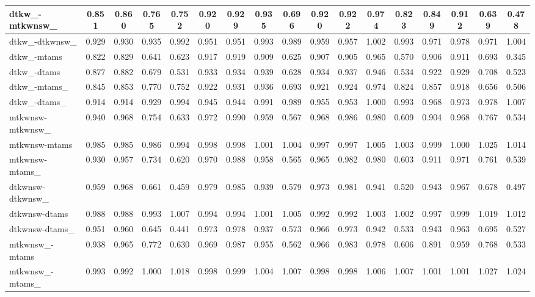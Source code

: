 \documentclass[%
 aip,
 jmp,%
 amsmath,amssymb,
 reprint,%
 floatfix,
]{revtex4-1}
\begin{document}
\begin{longtable*}{|p{2cm}||c|c|c|c|| c|c|c|c|| c|c|c|c|| c|c|c|c|}
dtkw\_-mtkwnsw\_ & 0.851 & 0.860 & 0.765 & 0.752 & 0.920 & 0.929 & 0.935 & 0.696 & 0.920 & 0.922 & 0.974 & 0.823 & 0.849 & 0.912 & 0.639 & 0.478 \\ \hline
dtkw\_-dtkwnsw\_ & 0.929 & 0.930 & 0.935 & 0.992 & 0.951 & 0.951 & 0.993 & 0.989 & 0.959 & 0.957 & 1.002 & 0.993 & 0.971 & 0.978 & 0.971 & 1.004 \\ \hline
dtkw\_-mtams & 0.822 & 0.829 & 0.641 & 0.623 & 0.917 & 0.919 & 0.909 & 0.625 & 0.907 & 0.905 & 0.965 & 0.570 & 0.906 & 0.911 & 0.693 & 0.345 \\ \hline
dtkw\_-dtams & 0.877 & 0.882 & 0.679 & 0.531 & 0.933 & 0.934 & 0.939 & 0.628 & 0.934 & 0.937 & 0.946 & 0.534 & 0.922 & 0.929 & 0.708 & 0.523 \\ \hline
dtkw\_-mtams\_ & 0.845 & 0.853 & 0.770 & 0.752 & 0.922 & 0.931 & 0.936 & 0.693 & 0.921 & 0.924 & 0.974 & 0.824 & 0.857 & 0.918 & 0.656 & 0.506 \\ \hline
dtkw\_-dtams\_ & 0.914 & 0.914 & 0.929 & 0.994 & 0.945 & 0.944 & 0.991 & 0.989 & 0.955 & 0.953 & 1.000 & 0.993 & 0.968 & 0.973 & 0.978 & 1.007 \\ \hline
mtkwnsw-mtkwnsw\_ & 0.940 & 0.968 & 0.754 & 0.633 & 0.972 & 0.990 & 0.959 & 0.567 & 0.968 & 0.986 & 0.980 & 0.609 & 0.904 & 0.968 & 0.767 & 0.534 \\ \hline
mtkwnsw-mtams & 0.985 & 0.985 & 0.986 & 0.994 & 0.998 & 0.998 & 1.001 & 1.004 & 0.997 & 0.997 & 1.005 & 1.003 & 0.999 & 1.000 & 1.025 & 1.014 \\ \hline
mtkwnsw-mtams\_ & 0.930 & 0.957 & 0.734 & 0.620 & 0.970 & 0.988 & 0.958 & 0.565 & 0.965 & 0.982 & 0.980 & 0.603 & 0.911 & 0.971 & 0.761 & 0.539 \\ \hline
dtkwnsw-dtkwnsw\_ & 0.959 & 0.968 & 0.661 & 0.459 & 0.979 & 0.985 & 0.939 & 0.579 & 0.973 & 0.981 & 0.941 & 0.520 & 0.943 & 0.967 & 0.678 & 0.497 \\ \hline
dtkwnsw-dtams & 0.988 & 0.988 & 0.993 & 1.007 & 0.994 & 0.994 & 1.001 & 1.005 & 0.992 & 0.992 & 1.003 & 1.002 & 0.997 & 0.999 & 1.019 & 1.012 \\ \hline
dtkwnsw-dtams\_ & 0.951 & 0.960 & 0.645 & 0.441 & 0.973 & 0.978 & 0.937 & 0.573 & 0.966 & 0.973 & 0.942 & 0.533 & 0.943 & 0.963 & 0.695 & 0.527 \\ \hline
mtkwnsw\_-mtams & 0.938 & 0.965 & 0.772 & 0.630 & 0.969 & 0.987 & 0.955 & 0.562 & 0.966 & 0.983 & 0.978 & 0.606 & 0.891 & 0.959 & 0.768 & 0.533 \\ \hline
mtkwnsw\_-mtams\_ & 0.993 & 0.992 & 1.000 & 1.018 & 0.998 & 0.999 & 1.004 & 1.007 & 0.998 & 0.998 & 1.006 & 1.007 & 1.001 & 1.001 & 1.027 & 1.024 \\ \hline

\end{longtable*}
\end{document}
